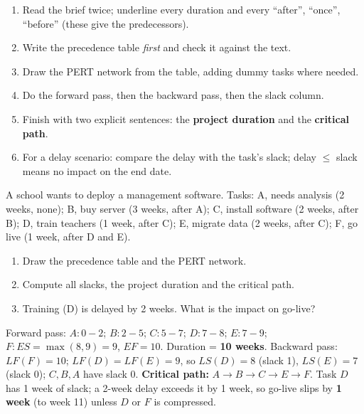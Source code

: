 \documentclass[11pt]{article}
\begin{document}
\begin{methode}
\begin{enumerate}
\item Read the brief twice; underline every duration and every ``after'', ``once'', ``before'' (these give the predecessors).
\item Write the precedence table \emph{first} and check it against the text.
\item Draw the PERT network from the table, adding dummy tasks where needed.
\item Do the forward pass, then the backward pass, then the slack column.
\item Finish with two explicit sentences: the \textbf{project duration} and the \textbf{critical path}.
\item For a delay scenario: compare the delay with the task's slack; delay $\le$ slack means no impact on the end date.
\end{enumerate}
\end{methode}

\begin{exercice}
A school wants to deploy a management software. Tasks: A, needs analysis (2 weeks, none); B, buy server (3 weeks, after A); C, install software (2 weeks, after B); D, train teachers (1 week, after C); E, migrate data (2 weeks, after C); F, go live (1 week, after D and E).
\begin{enumerate}
\item Draw the precedence table and the PERT network.
\item Compute all slacks, the project duration and the critical path.
\item Training (D) is delayed by 2 weeks. What is the impact on go-live?
\end{enumerate}
\end{exercice}

\begin{corrige}[Exercise 1]
Forward pass: $A: 0\!-\!2$; $B: 2\!-\!5$; $C: 5\!-\!7$; $D: 7\!-\!8$; $E: 7\!-\!9$; $F: ES=\max(8,9)=9$, $EF=10$. Duration = \textbf{10 weeks}. Backward pass: $LF(F)=10$; $LF(D)=LF(E)=9$, so $LS(D)=8$ (slack 1), $LS(E)=7$ (slack 0); $C, B, A$ have slack 0. \textbf{Critical path:} $A \rightarrow B \rightarrow C \rightarrow E \rightarrow F$. Task $D$ has 1 week of slack; a 2-week delay exceeds it by 1 week, so go-live slips by \textbf{1 week} (to week 11) unless $D$ or $F$ is compressed.
\end{corrige}
\end{document}
